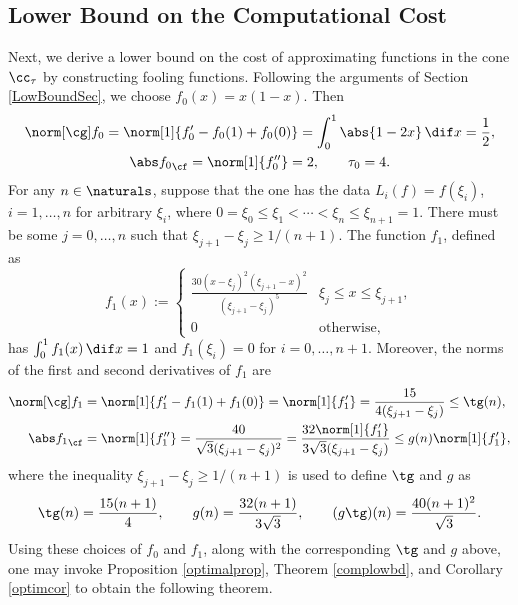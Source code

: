 \subsection{Lower Bound on the Computational Cost}
Next, we derive a lower bound on the cost of approximating functions in the cone $\cc_{\tau}$ by constructing fooling functions. Following the arguments of Section \ref{LowBoundSec}, we choose  $f_0(x)=x(1-x).$ Then
\begin{gather*}
\Gnorm{f_0}=\norm[1]{f'_0-f_0(1)+f_0(0)}=\int_0^1 \abs{1-2x} \, \dif x = \frac{1}{2}, \\ \Fnorm{f_0}=\norm[1]{f''_0}=2, \qquad \tau_0=4.
\end{gather*}
For any $n \in \naturals$, suppose that the one has the data $L_i(f)=f(\xi_i)$, $i=1, \ldots, n$ for arbitrary $\xi_i$, where $0=\xi_0 \le \xi_1 < \cdots < \xi_n \le \xi_{n+1} = 1$.  There must be some $j=0, \ldots, n$ such that $\xi_{j+1} - \xi_j \ge 1/(n+1)$.  The function $f_{1}$, defined as
$$
f_{1}(x):=\begin{cases} \displaystyle
\frac{30(x-\xi_{j})^{2}(\xi_{j+1}-x)^{2}}{(\xi_{j+1}-\xi_{j})^5} & \xi_{j} \le x \leq \xi_{j+1},\\
0 & \text{otherwise},
\end{cases}
$$
has $\int_0^1 f_1(x) \, \dif x=1$ and $f_1(\xi_i)=0$ for $i=0, \ldots, n+1$.  Moreover, the norms of the first and second derivatives of $f_1$ are
\begin{align*}
\Gnorm{f_1}&=\norm[1]{f'_1-f_1(1)+f_1(0)}=\norm[1]{f'_1}=\frac{15}{4(\xi_{j+1}-\xi_{j})}\leq \tg(n),\\
\Fnorm{f_1}&=\norm[1]{f''_1}=\frac{40}{\sqrt{3}(\xi_{j+1}-\xi_{j})^2}
=\frac{32\norm[1]{f'_1}}{3\sqrt{3}(\xi_{j+1}-\xi_{j})}
 \leq g(n) \norm[1]{f'_1},
\end{align*}
where the inequality $\xi_{j+1} - \xi_j \ge 1/(n+1)$ is used to define $\tg$ and $g$ as
\[
\tg(n) = \frac{15(n+1)}{4}, \qquad g(n) = \frac{32(n+1)}{3\sqrt{3}}, \qquad (g\tg)(n) = \frac{40(n+1)^2}{\sqrt{3}}.
\]
Using these choices of $f_0$ and $f_1$, along with the corresponding $\tg$ and $g$ above, one may invoke Proposition \ref{optimalprop}, Theorem \ref{complowbd}, and Corollary \ref{optimcor} to obtain the following theorem.

